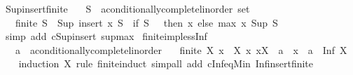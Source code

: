 \begin{isabellebody}
\endisatagproof
{\isafoldproof}%
%
\isadelimproof
\isanewline
%
\endisadelimproof
\isanewline
{}\isamarkupfalse%
\ Sup{\isacharunderscore}{\kern0pt}insert{\isacharunderscore}{\kern0pt}finite{\isacharcolon}{\kern0pt}\isanewline
\ \ \ S\ {\isacharcolon}{\kern0pt}{\isacharcolon}{\kern0pt}\ {\isachardoublequoteopen}{\isacharprime}{\kern0pt}a{\isacharcolon}{\kern0pt}{\isacharcolon}{\kern0pt}conditionally{\isacharunderscore}{\kern0pt}complete{\isacharunderscore}{\kern0pt}linorder\ set{\isachardoublequoteclose}\isanewline
\ \ \ {\isachardoublequoteopen}finite\ S\ {\isasymLongrightarrow}\ Sup\ {\isacharparenleft}{\kern0pt}insert\ x\ S{\isacharparenright}{\kern0pt}\ {\isacharequal}{\kern0pt}\ {\isacharparenleft}{\kern0pt}if\ S\ {\isacharequal}{\kern0pt}\ {\isacharbraceleft}{\kern0pt}{\isacharbraceright}{\kern0pt}\ then\ x\ else\ max\ x\ {\isacharparenleft}{\kern0pt}Sup\ S{\isacharparenright}{\kern0pt}{\isacharparenright}{\kern0pt}{\isachardoublequoteclose}\isanewline
%
\isadelimproof
\ \ %
\endisadelimproof
%
\isatagproof
{}\isamarkupfalse%
\ {\isacharparenleft}{\kern0pt}simp\ add{\isacharcolon}{\kern0pt}\ cSup{\isacharunderscore}{\kern0pt}insert\ sup{\isacharunderscore}{\kern0pt}max{\isacharparenright}{\kern0pt}%
\endisatagproof
{\isafoldproof}%
%
\isadelimproof
\isanewline
%
\endisadelimproof
\isanewline
{}\isamarkupfalse%
\ finite{\isacharunderscore}{\kern0pt}imp{\isacharunderscore}{\kern0pt}less{\isacharunderscore}{\kern0pt}Inf{\isacharcolon}{\kern0pt}\isanewline
\ \ \ a\ {\isacharcolon}{\kern0pt}{\isacharcolon}{\kern0pt}\ {\isachardoublequoteopen}{\isacharprime}{\kern0pt}a{\isacharcolon}{\kern0pt}{\isacharcolon}{\kern0pt}conditionally{\isacharunderscore}{\kern0pt}complete{\isacharunderscore}{\kern0pt}linorder{\isachardoublequoteclose}\isanewline
\ \ \ {\isachardoublequoteopen}{\isasymlbrakk}finite\ X{\isacharsemicolon}{\kern0pt}\ x\ {\isasymin}\ X{\isacharsemicolon}{\kern0pt}\ {\isasymAnd}x{\isachardot}{\kern0pt}\ x{\isasymin}X\ {\isasymLongrightarrow}\ a\ {\isacharless}{\kern0pt}\ x{\isasymrbrakk}\ {\isasymLongrightarrow}\ a\ {\isacharless}{\kern0pt}\ Inf\ X{\isachardoublequoteclose}\isanewline
%
\isadelimproof
\ \ %
\endisadelimproof
%
\isatagproof
{}\isamarkupfalse%
\ {\isacharparenleft}{\kern0pt}induction\ X\ rule{\isacharcolon}{\kern0pt}\ finite{\isacharunderscore}{\kern0pt}induct{\isacharparenright}{\kern0pt}\ {\isacharparenleft}{\kern0pt}simp{\isacharunderscore}{\kern0pt}all\ add{\isacharcolon}{\kern0pt}\ cInf{\isacharunderscore}{\kern0pt}eq{\isacharunderscore}{\kern0pt}Min\ Inf{\isacharunderscore}{\kern0pt}insert{\isacharunderscore}{\kern0pt}finite{\isacharparenright}{\kern0pt}%

\end{isabellebody}
